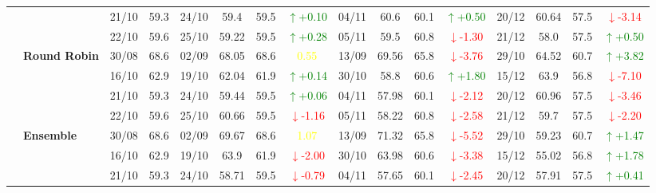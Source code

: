 \documentclass{ieeeaccess}
\begin{document}
{\begin{longtable}{llcc|cccc|cccc|cccc}
&
& 21/10 & 59.3 & 24/10 & 59.4 & 59.5 & \textcolor{green}{\(\uparrow\)+0.10} & 04/11 & 60.6 & 60.1 & \textcolor{green}{\(\uparrow\)+0.50} & 20/12 & 60.64 & 57.5 & \textcolor{red}{\(\downarrow\)-3.14} \\

&
& 22/10 & 59.6 & 25/10 & 59.22 & 59.5 & \textcolor{green}{\(\uparrow\)+0.28} & 05/11 & 59.5 & 60.8 & \textcolor{red}{\(\downarrow\)-1.30} & 21/12 & 58.0 & 57.5 & \textcolor{green}{\(\uparrow\)+0.50} \\
\cmidrule(lr){2-16}


& \textbf{Round Robin}
& 30/08 & 68.6 & 02/09 & 68.05 & 68.6 & \textcolor{yellow}{0.55} & 13/09 & 69.56 & 65.8 & \textcolor{red}{\(\downarrow\)-3.76} & 29/10 & 64.52 & 60.7 & \textcolor{green}{\(\uparrow\)+3.82} \\

&
& 16/10 & 62.9 & 19/10 & 62.04 & 61.9 & \textcolor{green}{\(\uparrow\)+0.14} & 30/10 & 58.8 & 60.6 & \textcolor{green}{\(\uparrow\)+1.80} & 15/12 & 63.9 & 56.8 & \textcolor{red}{\(\downarrow\)-7.10} \\

&
& 21/10 & 59.3 & 24/10 & 59.44 & 59.5 & \textcolor{green}{\(\uparrow\)+0.06} & 04/11 & 57.98 & 60.1 & \textcolor{red}{\(\downarrow\)-2.12} & 20/12 & 60.96 & 57.5 & \textcolor{red}{\(\downarrow\)-3.46} \\

&
& 22/10 & 59.6 & 25/10 & 60.66 & 59.5 & \textcolor{red}{\(\downarrow\)-1.16} & 05/11 & 58.22 & 60.8 & \textcolor{red}{\(\downarrow\)-2.58} & 21/12 & 59.7 & 57.5 & \textcolor{red}{\(\downarrow\)-2.20} \\
\cmidrule(lr){2-16}

& \textbf{Ensemble}
& 30/08 & 68.6 & 02/09 & 69.67 & 68.6 & \textcolor{yellow}{1.07} & 13/09 & 71.32 & 65.8 & \textcolor{red}{\(\downarrow\)-5.52} & 29/10 & 59.23 & 60.7 & \textcolor{green}{\(\uparrow\)+1.47} \\

&
& 16/10 & 62.9 & 19/10 & 63.9 & 61.9 & \textcolor{red}{\(\downarrow\)-2.00} & 30/10 & 63.98 & 60.6 & \textcolor{red}{\(\downarrow\)-3.38} & 15/12 & 55.02 & 56.8 & \textcolor{green}{\(\uparrow\)+1.78} \\

&
& 21/10 & 59.3 & 24/10 & 58.71 & 59.5 & \textcolor{red}{\(\downarrow\)-0.79} & 04/11 & 57.65 & 60.1 & \textcolor{red}{\(\downarrow\)-2.45} & 20/12 & 57.91 & 57.5 & \textcolor{green}{\(\uparrow\)+0.41} \\


\end{longtable}}
\end{document}

